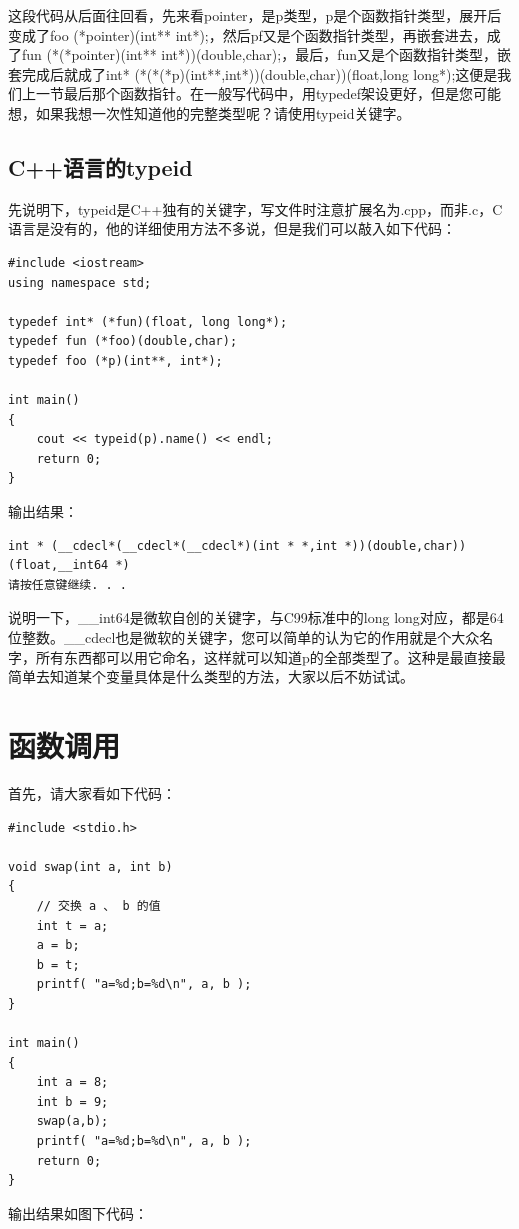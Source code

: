 \documentclass[11pt,twoside,a4paper,titlepage]{article}	%
\begin{document}
这段代码从后面往回看，先来看pointer，是p类型，p是个函数指针类型，展开后变成了foo (*pointer)(int** int*);，然后pf又是个函数指针类型，再嵌套进去，成了fun (*(*pointer)(int** int*))(double,char);，最后，fun又是个函数指针类型，嵌套完成后就成了int* (*(*(*p)(int**,int*))(double,char))(float,long long*);这便是我们上一节最后那个函数指针。在一般写代码中，用typedef架设更好，但是您可能想，如果我想一次性知道他的完整类型呢？请使用typeid关键字。

\subsection{C++语言的typeid}
先说明下，{\color{red}typeid是C++独有的关键字，写文件时注意扩展名为.cpp，而非.c}，C语言是没有的，他的详细使用方法不多说，但是我们可以敲入如下代码：

\begin{lstlisting}
#include <iostream>
using namespace std;

typedef int* (*fun)(float, long long*);
typedef fun (*foo)(double,char);
typedef foo (*p)(int**, int*);

int main()
{
	cout << typeid(p).name() << endl;
	return 0;
}
\end{lstlisting}

输出结果：
\begin{lstlisting}
int * (__cdecl*(__cdecl*(__cdecl*)(int * *,int *))(double,char))(float,__int64 *) 
请按任意键继续. . .
\end{lstlisting}

说明一下，\_\_int64是微软自创的关键字，与C99标准中的long long对应，都是64位整数。\_\_cdecl也是微软的关键字，您可以简单的认为它的作用就是个大众名字，所有东西都可以用它命名，这样就可以知道p的全部类型了。这种是最直接最简单去知道某个变量具体是什么类型的方法，大家以后不妨试试。

\newpage
\section{函数调用}
首先，请大家看如下代码：
\begin{lstlisting}
#include <stdio.h>

void swap(int a, int b)
{
	// 交换 a 、 b 的值
	int t = a;
	a = b;
	b = t;
	printf( "a=%d;b=%d\n", a, b );
}

int main()
{
	int a = 8;
	int b = 9;
	swap(a,b);
	printf( "a=%d;b=%d\n", a, b );
	return 0;
}
\end{lstlisting}

输出结果如图下代码：
\end{document}
